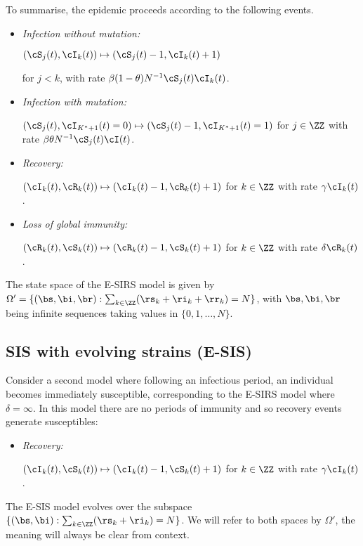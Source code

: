 \documentclass[review]{elsarticle}
\begin{document}
To summarise, the epidemic proceeds according to the following events. 

\begin{itemize}
	\item \emph{Infection without mutation:} 
	
		$(\cS_j(t), \cI_k(t)) \mapsto (\cS_j(t) -1, \cI_k(t) +1)$

	for $j < k$, with rate $\beta(1-\theta) N^{-1} \cS_j(t)\cI_k(t)$.
	\item \emph{Infection with mutation:}
	
		$(\cS_j(t), \cI_{K^*+1}(t)=0) \mapsto (\cS_j(t)-1, \cI_{K^*+1}(t)=1)$
	for $j \in \ZZ$ with rate $\beta \theta N^{-1} \cS_j(t) \cI(t)$.
	\item \emph{Recovery:}
	
		$(\cI_k(t), \cR_k(t)) \mapsto (\cI_k(t) - 1, \cR_k(t) +1)$
	for $k \in \ZZ$ with rate $\gamma \cI_k(t)$.
	\item \emph{Loss of global immunity:}

		$(\cR_k(t), \cS_k(t)) \mapsto (\cR_k(t) -1, \cS_k(t) + 1)$
	for $k \in \ZZ$ with rate $\delta \cR_k(t)$.
\end{itemize}

The state space of the E-SIRS model is given by $\Omega'= \{ (\bs, \bi, \br): \sum_{k \in \ZZ} (\rs_k + \ri_k + \rr_k) = N \}$, with $\bs, \bi, \br$ being infinite sequences taking values in $\{0,1,\dots,N\}$. 

\subsection{SIS with evolving strains (E-SIS)}\label{subsec: sis}
Consider a second model where
following an infectious period, 
an individual becomes immediately susceptible, corresponding to the E-SIRS model where $\delta = \infty$.
In this model there are no periods of immunity and so recovery events generate susceptibles:
	
	
 \begin{itemize}
 	\item \emph{Recovery:}
 	
 		$(\cI_k(t), \cS_{k}(t)) \mapsto (\cI_k(t) - 1, \cS_{k}(t) +1)$
 	for $k \in \ZZ$ with rate $\gamma \cI_k(t)$.
 \end{itemize}
The E-SIS model evolves over the subspace $\{ (\bs, \bi): \sum_{k \in \ZZ} (\rs_k + \ri_k) = N  \}$. We will refer to both spaces by $\Omega'$, the meaning will always be clear from context.
\end{document}
